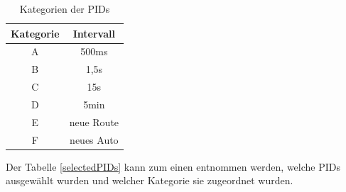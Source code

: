 		\begin{table}[htp!]
			\caption{Kategorien der \acp{PID}}
			\label{KategorieTable}	
			
			\begin{center}
				\begin{tabular}{|c|c|}
					\hline 
					Kategorie & Intervall \\ 
					\hline 
					A & 500ms \\ 
					\hline 
					B & 1,5s \\ 
					\hline 
					C & 15s \\ 
					\hline 
					D & 5min \\ 
					\hline 
					E & neue Route \\ 
					\hline 
					F & neues Auto \\ 
					\hline 
				\end{tabular} 
			\end{center}
		\end{table}
		

		
		Der Tabelle \ref{selectedPIDs} kann zum einen entnommen werden, welche \acp{PID} ausgewählt wurden und welcher Kategorie sie zugeordnet wurden.
		

